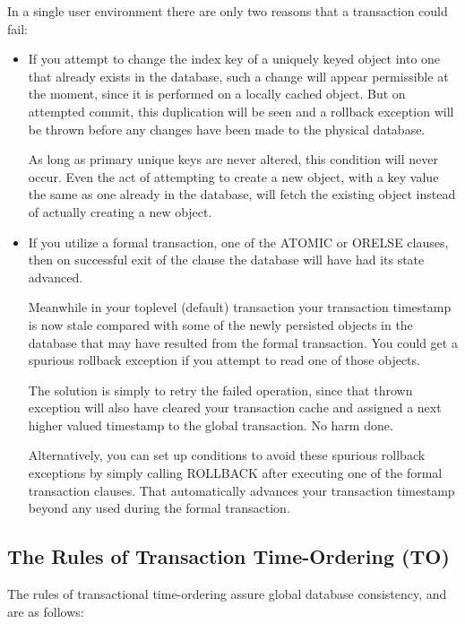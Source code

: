 \documentclass[article,oneside]{memoir}
\begin{document}
In a single user environment there are only two reasons that a transaction could fail: 
\begin{itemize}
\item If you attempt to change the index key of a uniquely keyed object  into one that already exists in the database, such a change will appear permissible at the moment, since it is performed on a locally cached object. But on attempted commit, this duplication will be seen and a rollback exception will be thrown before any changes have been made to the physical database.

As long as primary unique keys are never altered, this condition will never occur. Even the act of attempting to create a new object, with a key value the same as one already in the database, will fetch the existing object instead of actually creating a new object. 

\item If you utilize a formal transaction, one of the {\ttfamily ATOMIC} or {\ttfamily ORELSE} clauses, then on successful exit of the clause the database will have had its state advanced. 

Meanwhile in your toplevel (default) transaction your transaction timestamp is now stale compared with some of the newly persisted objects in the database that may have resulted from the formal transaction. You could get a spurious rollback exception if you attempt to read one of those objects. 

The solution is simply to retry the failed operation, since that thrown exception will also have cleared your transaction cache and assigned a next higher valued timestamp to the global transaction. No harm done.

Alternatively, you can set up conditions to avoid these spurious rollback exceptions by simply calling {\ttfamily ROLLBACK} after executing one of the formal transaction clauses. That automatically advances your transaction timestamp beyond any used during the formal transaction.
\end{itemize}

\subsection{The Rules of Transaction Time-Ordering (TO)}
The rules of transactional time-ordering assure global database consistency, and are as follows:
\end{document}
